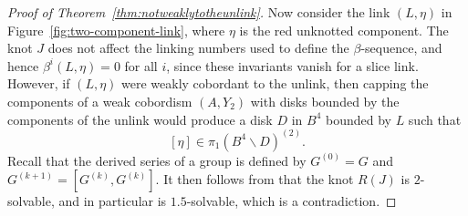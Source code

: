 \documentclass[a4paper, 11pt]{amsart}
\newtheorem{remark}[theorem]{Remark}
\theoremstyle{definition}
\newcommand{\Z}{\mathbb{Z}}
\begin{document}
\begin{proof}[Proof of Theorem~\ref{thm:notweaklytotheunlink}]
Now consider the link $(L,\eta)$ in Figure~\ref{fig:two-component-link}, where $\eta$ is the red unknotted component. The knot $J$ does not affect the linking numbers used to define the $\beta$-sequence, and hence $\beta^i(L,\eta)=0$ for all $i$, since these invariants vanish for a slice link. However, if $(L,\eta)$ were weakly cobordant to the unlink, then capping the components of a weak cobordism $(A,Y_2)$ with disks bounded by the components of the unlink would produce a disk $D$ in $B^4$ bounded by $L$ such that
\[
[\eta]\in \pi_1(B^4\smallsetminus D)^{(2)}.
\]
Recall that the derived series of a group is defined by $G^{(0)}=G$ and
\(
G^{(k+1)}=[G^{(k)},G^{(k)}].
\)
It then follows from \cite[Proposition~6.1]{DavParHarPreprint} that the knot $R(J)$ is $2$-solvable, and in particular is $1.5$-solvable, which is a contradiction.
\end{proof}




\end{document}
